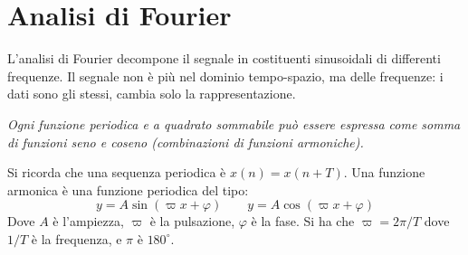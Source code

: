 \section{Analisi di Fourier}
L'analisi di Fourier decompone il segnale in costituenti sinusoidali di differenti frequenze. Il segnale non è più nel dominio tempo-spazio, ma delle frequenze: i dati sono gli stessi, cambia solo la rappresentazione.

\textit{Ogni funzione periodica e a quadrato sommabile può essere espressa come somma di funzioni seno e coseno (combinazioni di funzioni armoniche).}

Si ricorda che una sequenza periodica è $x(n) = x(n + T)$. Una funzione armonica è una funzione periodica del tipo:
$$y = A\sin(\varpi x + \varphi) \qquad y = A\cos(\varpi x + \varphi)$$
Dove $A$ è l'ampiezza, $\varpi$ è la pulsazione, $\varphi$ è la fase. Si ha che $\varpi = 2\pi/T$ dove $1/T$ è la frequenza, e $\pi$ è $180^{\circ}$.